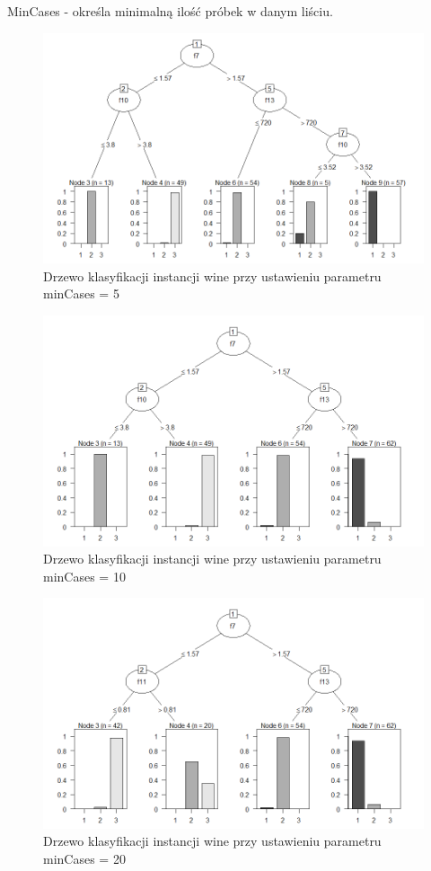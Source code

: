 \documentclass[12pt,a4paper]{article}
\begin{document}
MinCases - określa minimalną ilość próbek w danym liściu.

\begin{figure}[H]
\centering
\includegraphics[width=1\textwidth]{wineMinCase5.png}
\caption{Drzewo klasyfikacji instancji wine przy ustawieniu parametru minCases = 5}
\end{figure}

\begin{figure}[H]
\centering
\includegraphics[width=1\textwidth]{wineMinCase10.png}
\caption{Drzewo klasyfikacji instancji wine przy ustawieniu parametru minCases = 10}
\end{figure}

\begin{figure}[H]
\centering
\includegraphics[width=1\textwidth]{wineMinCase20.png}
\caption{Drzewo klasyfikacji instancji wine przy ustawieniu parametru minCases = 20}
\end{figure}
\end{document}
